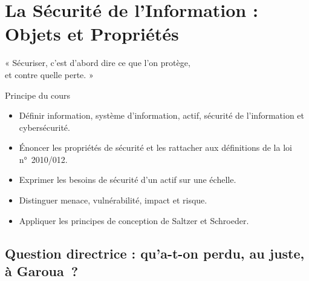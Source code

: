 
\chapter{La Sécurité de l'Information : Objets et Propriétés}
\label{chap:proprietes}

\epigraph{%
    « Sécuriser, c'est d'abord dire ce que l'on protège,\\
    et contre quelle perte. »%
}{Principe du cours}


\begin{boxobjectifs}
\begin{itemize}
    \item Définir information, système d'information, actif, sécurité de
          l'information et cybersécurité.
    \item Énoncer les propriétés de sécurité et les rattacher aux
          définitions de la loi n°~2010/012.
    \item Exprimer les besoins de sécurité d'un actif sur une échelle.
    \item Distinguer menace, vulnérabilité, impact et risque.
    \item Appliquer les principes de conception de Saltzer et Schroeder.
\end{itemize}
\end{boxobjectifs}

\bigskip

\section*{Question directrice : qu'a-t-on perdu, au juste, à Garoua~?}

